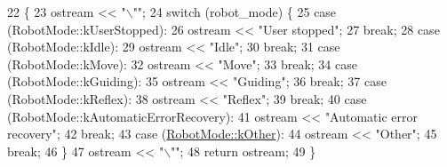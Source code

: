 \begin{DoxyCode}
22                                                                         \{
23   ostream << \textcolor{stringliteral}{"\(\backslash\)""};
24   \textcolor{keywordflow}{switch} (robot\_mode) \{
25     \textcolor{keywordflow}{case} (RobotMode::kUserStopped):
26       ostream << \textcolor{stringliteral}{"User stopped"};
27       \textcolor{keywordflow}{break};
28     \textcolor{keywordflow}{case} (RobotMode::kIdle):
29       ostream << \textcolor{stringliteral}{"Idle"};
30       \textcolor{keywordflow}{break};
31     \textcolor{keywordflow}{case} (RobotMode::kMove):
32       ostream << \textcolor{stringliteral}{"Move"};
33       \textcolor{keywordflow}{break};
34     \textcolor{keywordflow}{case} (RobotMode::kGuiding):
35       ostream << \textcolor{stringliteral}{"Guiding"};
36       \textcolor{keywordflow}{break};
37     \textcolor{keywordflow}{case} (RobotMode::kReflex):
38       ostream << \textcolor{stringliteral}{"Reflex"};
39       \textcolor{keywordflow}{break};
40     \textcolor{keywordflow}{case} (RobotMode::kAutomaticErrorRecovery):
41       ostream << \textcolor{stringliteral}{"Automatic error recovery"};
42       \textcolor{keywordflow}{break};
43     \textcolor{keywordflow}{case} (\hyperlink{namespacetesting_1_1internal_aa8747bda20137c9aa7f846dee830e686ad47f29150ab7a9ec8ce2491f44537347}{RobotMode::kOther}):
44       ostream << \textcolor{stringliteral}{"Other"};
45       \textcolor{keywordflow}{break};
46   \}
47   ostream << \textcolor{stringliteral}{"\(\backslash\)""};
48   \textcolor{keywordflow}{return} ostream;
49 \}
\end{DoxyCode}
